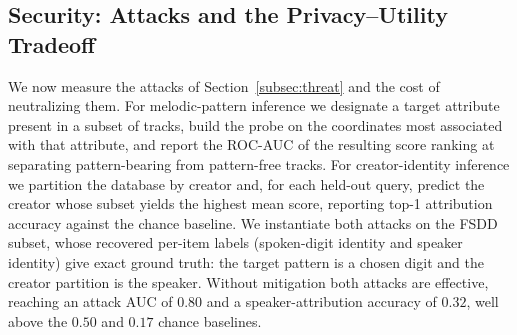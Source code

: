 \documentclass[sigconf,nonacm]{acmart}
\begin{document}
\begin{table}[t]
\centering\setlength{\tabcolsep}{4pt}
\caption{nDCG@10 of WHIP with uniform versus learned per-block weights on held-out queries. When blocks differ in relevance, learned weights improve nDCG@10 by 0.12 to 0.27; when all blocks are equally informative, they stay near uniform. Encrypted WHIP matches plaintext weighted scores to within $10^{-5}$.}
\label{tab:weighting}
\end{table}

\subsection{Security: Attacks and the Privacy--Utility Tradeoff}
\label{sec:security}
We now measure the attacks of Section~\ref{subsec:threat} and the cost of neutralizing them. For melodic-pattern inference we designate a target attribute present in a subset of tracks, build the probe on the coordinates most associated with that attribute, and report the ROC-AUC of the resulting score ranking at separating pattern-bearing from pattern-free tracks. For creator-identity inference we partition the database by creator and, for each held-out query, predict the creator whose subset yields the highest mean score, reporting top-1 attribution accuracy against the chance baseline. We instantiate both attacks on the FSDD subset, whose recovered per-item labels (spoken-digit identity and speaker identity) give exact ground truth: the target pattern is a chosen digit and the creator partition is the speaker. Without mitigation both attacks are effective, reaching an attack AUC of $0.80$ and a speaker-attribution accuracy of $0.32$, well above the $0.50$ and $0.17$ chance baselines.
\end{document}
